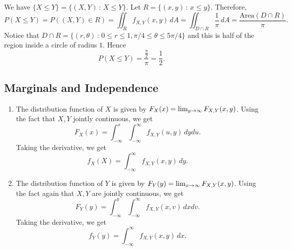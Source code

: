 \begin{problem}
We have $\{ X \leq Y \} = \{ (X, Y) \, : \, X \leq Y \}$. Let $R = \{ (x, y) \, : \, x \leq y \}$. Therefore,
    \[
        P (X \leq Y ) = P ( (X, Y) \in R ) = \iint_R f_{X, Y} (x, y) \, dA = \iint_{D \cap R} \frac{1}{\pi} \, dA = \frac{\mathrm{Area} (D \cap R )}{\pi} .
    \]
Notice that $D \cap R = \{ (r, \theta ) \, : \, 0 \leq r \leq 1 , \pi/4 \leq \theta \leq 5 \pi / 4 \}$ and this is half of the region inside a circle of radius $1$. Hence
    \[
        P (X \leq Y ) = \frac{\frac{\pi}{2}}{\pi} = \frac{1}{2} . \tag*{$\square$}
    \]

\end{problem}

\subsection{Marginals and Independence}

\begin{problem}
    \begin{enumerate}[label=\alph*)]
        \item The distribution function of $X$ is given by $F_X (x) = \lim_{y \rightarrow \infty} F_{X, Y} (x, y)$. Using the fact that $X, Y$ jointly continuous, we get
            \[
                F_X (x) = \int_{-\infty}^x \int_{-\infty}^\infty f_{X, Y} (u, y ) \, dy du .
            \]
        Taking the derivative, we get
            \[
                f_X (X) = \int_{-\infty}^\infty f_{X, Y} (x, y) \, dy .
            \]
        \item The distribution function of $Y$ is given by $F_Y (y) = \lim_{x \rightarrow \infty} F_{X, Y} (x, y)$. Using the fact again that $X, Y$ are jointly continuous, we get
            \[
                F_Y (y) = \int_{-\infty}^y \int_{-\infty}^\infty f_{X, Y} (x, v ) \, dx dv .
            \]
        Taking the derivative, we get
            \[
                f_Y (y) = \int_{-\infty}^\infty f_{X, Y} (x, y) \, dx . \tag*{$\square$}
            \]
    \end{enumerate}
\end{problem}



